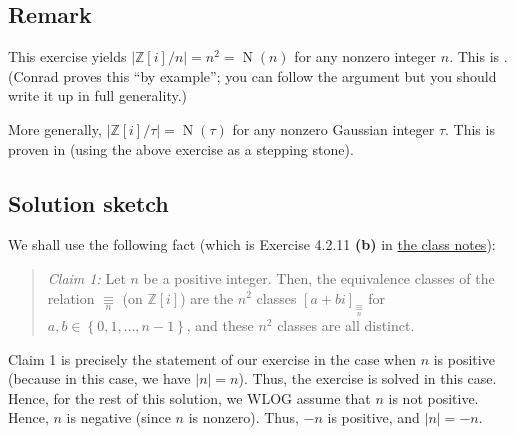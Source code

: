 \documentclass[paper=a4, fontsize=12pt]{scrartcl}%
\theoremstyle{plainsl}
\theoremstyle{definition}
\theoremstyle{remark}
\newenvironment{statement}{\begin{quote}}{\end{quote}}
\begin{document}
\subsection{Remark}

This exercise yields $\left|  \mathbb{Z}\left[  i \right]  / n \right|  =
n^{2} = \operatorname{N}\left(  n \right)  $ for any nonzero integer $n$. This
is \cite[Lemma 7.15]{Conrad-Gauss}. (Conrad proves this ``by example''; you
can follow the argument but you should write it up in full generality.)

More generally, $\left|  \mathbb{Z}\left[  i \right]  / \tau\right|  =
\operatorname{N}\left(  \tau\right)  $ for any nonzero Gaussian integer $\tau
$. This is proven in \cite[Theorem 7.14]{Conrad-Gauss} (using the above
exercise as a stepping stone).

\subsection{Solution sketch}

We shall use the following fact (which is Exercise 4.2.11 \textbf{(b)} in
\href{http://www.cip.ifi.lmu.de/~grinberg/t/19s/notes.pdf}{the class notes}):

\begin{statement}
\textit{Claim 1:} Let $n$ be a positive integer. Then, the equivalence classes
of the relation $\underset{n}{\equiv}$ (on $\mathbb{Z}\left[  i\right]  $) are
the $n^{2}$ classes $\left[  a+bi\right]  _{\underset{n}{\equiv}}$ for
$a,b\in\left\{  0,1,\ldots,n-1\right\}  $, and these $n^{2}$ classes are all distinct.
\end{statement}

Claim 1 is precisely the statement of our exercise in the case when $n$ is
positive (because in this case, we have $\left\vert n\right\vert =n$). Thus,
the exercise is solved in this case. Hence, for the rest of this solution, we
WLOG assume that $n$ is not positive. Hence, $n$ is negative (since $n$ is
nonzero). Thus, $-n$ is positive, and $\left\vert n\right\vert =-n$.
\end{document}
